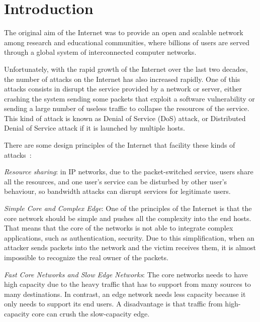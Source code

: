 
\chapter{Introduction}
\label{chapter:intro}

The original aim of the Internet was to provide an open and scalable network among research and educational communities, where billions of users are served through a global system of interconnected computer networks.

\par

Unfortunately, with the rapid growth of the Internet over the last two decades, the number of attacks on the Internet has also increased rapidly. One of this attacks consists in disrupt the service provided by a network or server, either crashing the system sending some packets that exploit a software vulnerability or sending a large number of useless traffic to collapse the resources of the service. This kind of attack is known as Denial of Service (DoS) attack, or Distributed Denial of Service attack if it is launched by multiple hosts.

\par

There are some design principles of the Internet that facility these kinds of attacks~\cite{peng2007survey}:

\par

\textit{Resource sharing}: in IP networks, due to the packet-switched service, users share all the resources, and one user's service can be disturbed by other user's behaviour, so bandwidth attacks can disrupt services for legitimate users.
\par
\textit{Simple Core and Complex Edge}: One of the principles of the Internet is that the core network should be simple and pushes all the complexity into the end hosts. That means that the core of the networks is not able to integrate complex applications, such as authentication, security. Due to this simplification, when an attacker sends packets into the network and the victim receives them, it is almost impossible to recognize the real owner of the packets.
\par
\textit{Fast Core Networks and Slow Edge Networks}: The core networks needs to have high capacity due to the heavy traffic that has to support from many sources to many destinations. In contrast, an edge network needs less capacity because it only needs to support its end users. A disadvantage is that traffic from high-capacity core can crush the slow-capacity edge.

